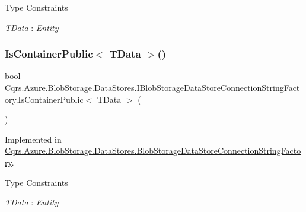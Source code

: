 \begin{Desc}
\item[Type Constraints]\begin{description}
\item[{\em T\+Data} : {\em Entity}]\end{description}
\end{Desc}
\mbox{\label{interfaceCqrs_1_1Azure_1_1BlobStorage_1_1DataStores_1_1IBlobStorageDataStoreConnectionStringFactory_a328ddc36412d9d01fed52aeed545c1a4_a328ddc36412d9d01fed52aeed545c1a4}} 
\subsubsection{\texorpdfstring{Is\+Container\+Public$<$ T\+Data $>$()}{IsContainerPublic< TData >()}}
{\footnotesize\ttfamily bool Cqrs.\+Azure.\+Blob\+Storage.\+Data\+Stores.\+I\+Blob\+Storage\+Data\+Store\+Connection\+String\+Factory.\+Is\+Container\+Public$<$ T\+Data $>$ (\begin{DoxyParamCaption}{ }\end{DoxyParamCaption})}



Implemented in \hyperlink{classCqrs_1_1Azure_1_1BlobStorage_1_1DataStores_1_1BlobStorageDataStoreConnectionStringFactory_a96e368a2b00f9614eff6ca4bcdeb3a24_a96e368a2b00f9614eff6ca4bcdeb3a24}{Cqrs.\+Azure.\+Blob\+Storage.\+Data\+Stores.\+Blob\+Storage\+Data\+Store\+Connection\+String\+Factory}.

\begin{Desc}
\item[Type Constraints]\begin{description}
\item[{\em T\+Data} : {\em Entity}]\end{description}
\end{Desc}
